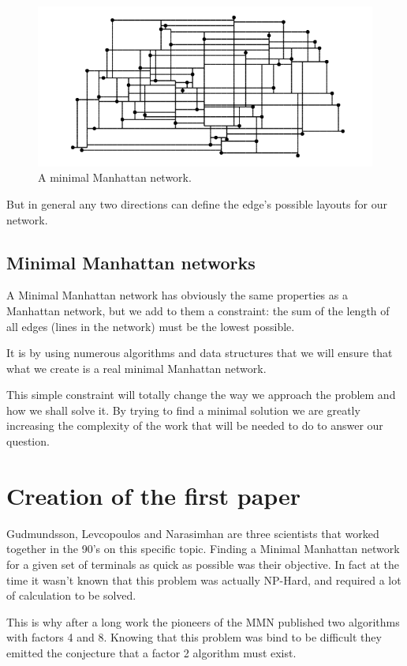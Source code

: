 \begin{figure}[H]
  \includegraphics[width=\linewidth]{img/mn_example.png}
  \caption{A minimal Manhattan network.}
  \label{fig:mn_expamle}
\end{figure}
But in general any two directions can define the edge's possible layouts for our network.
\subsection{Minimal Manhattan networks}
A Minimal Manhattan network has obviously the same properties as a Manhattan network, but we add to them a constraint: the sum of the length of all edges (lines in the network) must be the lowest possible.

It is by using numerous algorithms and data structures that we will ensure that what we create is a real minimal Manhattan network.

This simple constraint will totally change the way we approach the problem and how we shall solve it. By trying to find  a minimal solution we are greatly increasing the complexity of the work that will be needed to do to answer our question.

\section{Creation of the first paper}%
Gudmundsson, Levcopoulos and Narasimhan are three scientists that worked together in the 90's on this specific topic. Finding a Minimal Manhattan network for a given set of terminals as quick as possible was their objective. In fact at the time it wasn't known that this problem was actually NP-Hard, and required a lot of calculation to be solved.

This is why after a long work the pioneers of the MMN published two algorithms with factors 4 and 8. Knowing that this problem was bind to be difficult they emitted the conjecture that a factor 2 algorithm must exist.


